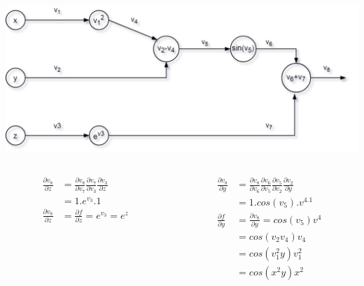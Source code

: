 \begin{frame}{}
	\includegraphics[width=.7\textwidth, center]{figuras/backprop_eg1.png}
	\begin{columns}[T]
		\begin{column}{.5\textwidth}
		
			\begin{align*}
					\frac{\partial v_8}{\partial z}&= 
					\frac{\partial v_8}{\partial v_7} 
					\frac{\partial v_7}{\partial v_3} 
					\frac{\partial v_3}{\partial z}  \\
					&= 1.e^{v_3}.1 \\
					\frac{\partial v_8}{\partial z}&=\frac{\partial f}{\partial z} 
					= e^{v_3}=e^z 
			\end{align*}
		\end{column}
		\begin{column}{.5\textwidth}
			\begin{align*}
			\frac{\partial v_8}{\partial y}&= 
			\frac{\partial v_8}{\partial v_6} 
			\frac{\partial v_6}{\partial v_5} 
			\frac{\partial v_5}{\partial v_2}  
			\frac{\partial v_2}{\partial y}\\
			& = 1.cos(v_5).v^4.1 \\
			\frac{\partial f}{\partial y}&=\frac{\partial v_8}{\partial y}
			= cos(v_5)v^4 \\
			&= cos(v_2v_4)v_4 \\
			&= cos(v^2_1y)v^2_1 \\
			&= cos(x^2y)x^2
			\end{align*}
		\end{column}
	\end{columns}
\end{frame}